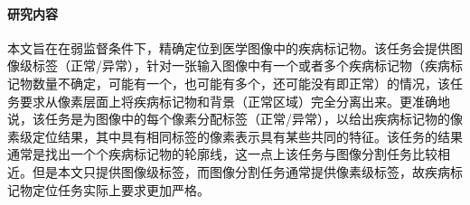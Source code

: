 \paragraph{研究内容} 本文旨在在弱监督条件下，精确定位到医学图像中的疾病标记物。该任务会提供图像级标签（正常/异常），针对一张输入图像中有一个或者多个疾病标记物（疾病标记物数量不确定，可能有一个，也可能有多个，还可能没有即正常）的情况，该任务要求从像素层面上将疾病标记物和背景（正常区域）完全分离出来。更准确地说，该任务是为图像中的每个像素分配标签（正常/异常），以给出疾病标记物的像素级定位结果，其中具有相同标签的像素表示具有某些共同的特征。该任务的结果通常是找出一个个疾病标记物的轮廓线，这一点上该任务与图像分割任务比较相近。但是本文只提供图像级标签，而图像分割任务通常提供像素级标签，故疾病标记物定位任务实际上要求更加严格。

